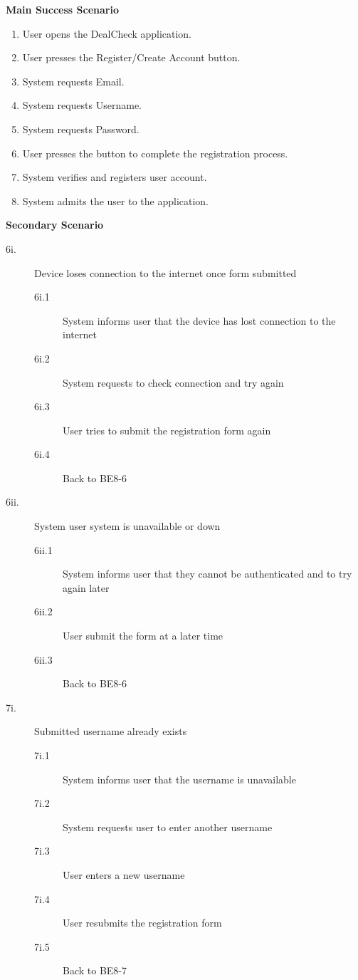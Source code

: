 \documentclass[]{article}
\begin{document}
\begin{enumerate}[{\bf {BE}1.}]
{\bf Main Success Scenario}
    \begin{enumerate}[1.]
        \item User opens the DealCheck application.
        \item User presses the Register/Create Account button.
        \item System requests Email.
        \item System requests Username.
        \item System requests Password.
        \item User presses the button to complete the registration process.
        \item System verifies and registers user account.
        \item System admits the user to the application.
    \end{enumerate}
    
    {\bf Secondary Scenario} \\
    \begin{description}
		\item [6i.] Device loses connection to the internet once form submitted
		\begin{description}
			\item [6i.1] System informs user that the device has lost connection to the internet
			\item [6i.2] System requests to check connection and try again
			\item [6i.3] User tries to submit the registration form again
			\item [6i.4] Back to BE8-6
		\end{description}

		\item [6ii.] System user system is unavailable or down
		\begin{description}
			\item [6ii.1] System informs user that they cannot be authenticated and to try again later
			\item [6ii.2] User submit the form at a later time
			\item [6ii.3] Back to BE8-6
		\end{description}

		\item [7i.] Submitted username already exists
		\begin{description}
			\item [7i.1] System informs user that the username is unavailable
			\item [7i.2] System requests user to enter another username
			\item [7i.3] User enters a new username
			\item [7i.4] User resubmits the registration form
			\item [7i.5] Back to BE8-7
		\end{description}


\end{description}
\end{enumerate}
\end{document}
